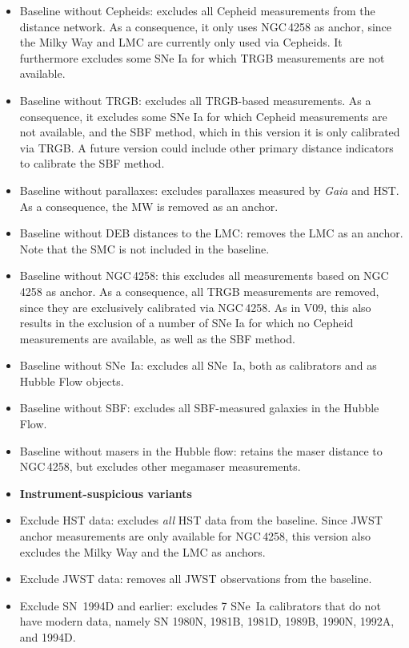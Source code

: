 \begin{itemize}
    \item[V08] Baseline without Cepheids: excludes all Cepheid measurements from the distance network.  As a consequence, it only uses NGC$\,$4258 as anchor, since the Milky Way and LMC are currently only used via Cepheids. It furthermore excludes some SNe Ia for which TRGB measurements are not available.
    \item[V09] Baseline without TRGB: excludes all TRGB-based measurements.  As a consequence, it excludes some SNe Ia for which Cepheid measurements are not available, and the SBF method, which in this version it is only calibrated via TRGB.  A future version could include other primary distance indicators to calibrate the SBF method.
    \item[V10] Baseline without parallaxes: excludes parallaxes measured by {\it Gaia} and {HST}. As a consequence, the MW is removed as an anchor.
    \item[V11] Baseline without DEB distances to the LMC: removes the LMC as an anchor.  Note that the SMC is not included in the baseline.
    \item[V12] Baseline without NGC$\,$4258: this excludes all measurements based on NGC 4258 as anchor. As a consequence, all TRGB measurements are removed, since they are exclusively calibrated via NGC$\,$4258. As in V09, this also results in the exclusion of a number of SNe Ia for which no Cepheid measurements are available, as well as the SBF method.
    \item[V13]  Baseline without SNe~Ia: excludes all SNe~Ia, both as calibrators and as Hubble Flow objects.
    \item[V14]  Baseline without SBF: excludes all SBF-measured galaxies in the Hubble Flow.
    \item[V15]  Baseline without masers in the Hubble flow: retains the maser distance to NGC$\,$4258, but excludes other megamaser measurements. 
    \smallskip\item[]\textbf{Instrument-suspicious variants}
    \item[V16]  Exclude HST data: excludes {\it all} HST data from the baseline.  Since JWST anchor measurements are only available for NGC$\,$4258, this version also excludes the Milky Way and the LMC as anchors. 
    \item[V17]  Exclude JWST data: removes all JWST observations from the baseline.
    \item[V18]  Exclude SN~1994D and earlier: excludes 7 SNe~Ia calibrators that do not have modern data, namely SN 1980N, 1981B, 1981D, 1989B, 1990N, 1992A, and 1994D.

\end{itemize}
